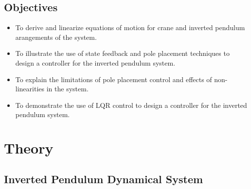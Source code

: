 \documentclass{article}
\begin{document}
\subsection{Objectives}

\begin{itemize}
  \item To derive and linearize equations of motion for crane and inverted pendulum arangements of the system.
  \item To illustrate the use of state feedback and pole placement techniques to design a controller for the inverted pendulum system.
  \item To explain the limitations of pole placement control and effects of non-linearities in the system.
  \item To demonstrate the use of LQR control to design a controller for the inverted pendulum system.
\end{itemize}


\section{Theory}

\subsection{Inverted Pendulum Dynamical System}
\end{document}
